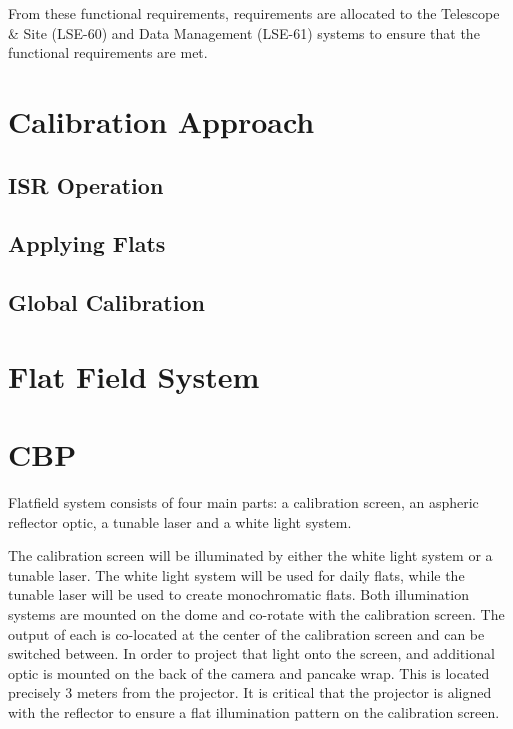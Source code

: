 \documentclass[SE,authoryear,toc]{article}
\begin{document}
\begin{table}[|||]
\begin{table}
\end{table}

From these functional requirements, requirements are allocated to the Telescope \& Site (LSE-60) and Data Management (LSE-61) systems to ensure that the functional requirements are met. 

\section{Calibration Approach}
\subsection{ISR Operation}
\subsection{Applying Flats}
\subsection{Global Calibration}

\section{Flat Field System}


\section{CBP}

Flatfield system consists of four main parts: a calibration screen, an aspheric reflector optic, a tunable laser and a white light system. 

The calibration screen will be illuminated by either the white light system or a tunable laser. The white light system will be used for daily flats, while the tunable laser will be used to create monochromatic flats. Both illumination systems are mounted on the dome and co-rotate with the calibration screen. The output of each is co-located at the center of the calibration screen and can be switched between. In order to project that light onto the screen, and additional optic is mounted on the back of the camera and pancake wrap. This is located precisely 3 meters from the projector. It is critical that the projector is aligned with the reflector to ensure a flat illumination pattern on the calibration screen. 


\end{table}
\end{document}
